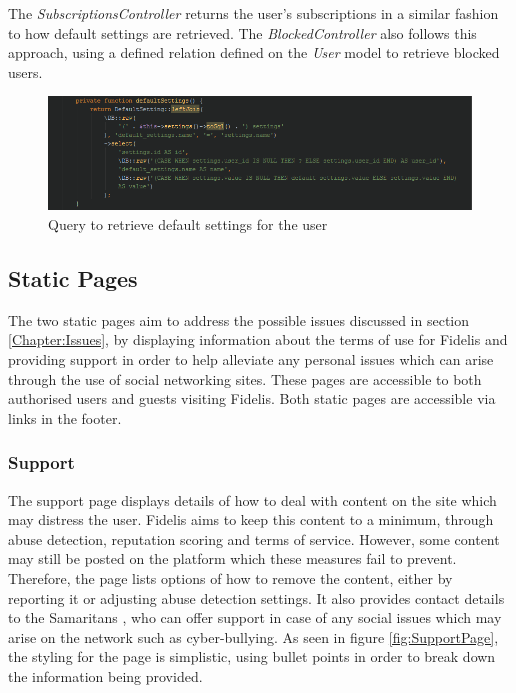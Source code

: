 The \textit{SubscriptionsController} returns the user's subscriptions in a similar fashion to how default settings are retrieved. The \textit{BlockedController} also follows this approach, using a defined relation defined on the \emph{User} model to retrieve blocked users.

\begin{figure}[H]
\centering
\includegraphics[width=\textwidth]{Images/Implementation/UserDefaultSettings}
\caption{Query to retrieve default settings for the user}
\label{fig:UserDefaultSettings}
\end{figure}

\subsection{Static Pages}
The two static pages aim to address the possible issues discussed in section \ref{Chapter:Issues}, by displaying information about the terms of use for Fidelis and providing support in order to help alleviate any personal issues which can arise through the use of social networking sites. These pages are accessible to both authorised users and guests visiting Fidelis. Both static pages are accessible via links in the footer.

\subsubsection{Support}
The support page displays details of how to deal with content on the site which may distress the user. Fidelis aims to keep this content to a minimum, through abuse detection, reputation scoring and terms of service. However, some content may still be posted on the platform which these measures fail to prevent. Therefore, the page lists options of how to remove the content, either by reporting it or adjusting abuse detection settings. It also provides contact details to the Samaritans \cite{Samaritans:Home}, who can offer support in case of any social issues which may arise on the network such as cyber-bullying. As seen in figure \ref{fig:SupportPage}, the styling for the page is simplistic, using bullet points in order to break down the information being provided.

